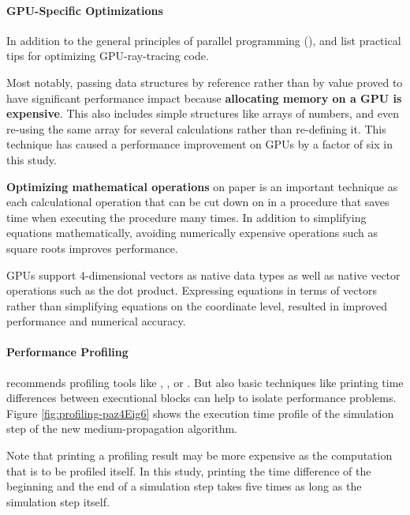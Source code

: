 \paragraph{GPU-Specific Optimizations}
In addition to the general principles of parallel programming (),  and  \cite{raytracingtips} list practical tips for optimizing GPU-ray-tracing code.

Most notably, passing data structures by reference rather than by value proved to have significant performance impact because \textbf{allocating memory on a GPU is expensive}. This also includes simple structures like arrays of numbers, and even re-using the same array for several calculations rather than re-defining it. This technique has caused a performance improvement on GPUs by a factor of six in this study.


\textbf{Optimizing mathematical operations} on paper is an important technique as each calculational operation that can be cut down on in a procedure that saves time when executing the procedure many times. In addition to simplifying equations mathematically, avoiding numerically expensive operations such as square roots improves performance.

GPUs support 4-dimensional vectors as native data types as well as native vector operations such as the dot product. Expressing equations in terms of vectors rather than simplifying equations on the coordinate level, resulted in improved performance and numerical accuracy.



\paragraph{Performance Profiling}
 recommends profiling tools like , , or  \cite{cudacourse}. But also basic techniques like printing time differences between executional blocks can help to isolate performance problems. Figure \ref{fig:profiling-paz4Eig6} shows the execution time profile of the simulation step of the new medium-propagation algorithm.

Note that printing a profiling result may be more expensive as the computation that is to be profiled itself. In this study, printing the time difference of the beginning and the end of a simulation step takes five times as long as the simulation step itself.

